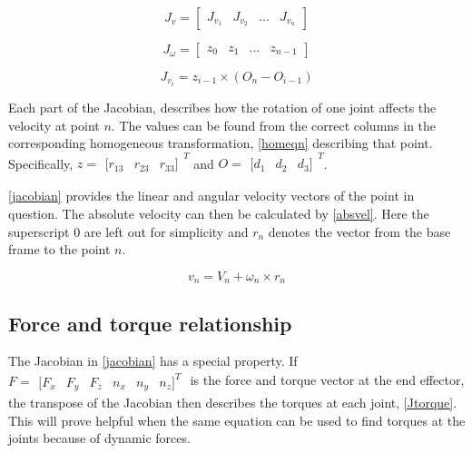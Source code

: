\begin{equation}\label{Jvel}
J_v = \begin{bmatrix}
J_{v_1} & J_{v_2} & ... & J_{v_n}
\end{bmatrix}
\end{equation}

\begin{equation}\label{Jomega}
J_{\omega} = \begin{bmatrix}
z_0 & z_1 & ... & z_{n-1}
\end{bmatrix}
\end{equation}

\begin{equation}\label{Jvi}
J_{v_i} = z_{i-1}\times (O_n - O_{i-1})
\end{equation}

Each part of the Jacobian,  describes how the rotation of one joint affects the velocity at point $n$. The values can be found from the correct columns in the corresponding homogeneous transformation, \eqref{homeqn} describing that point. Specifically, $z=\begin{matrix}[
r_{13} & r_{23} & r_{33}]
\end{matrix}^T$ and $O=\begin{matrix}[
d_{1} & d_{2} & d_{3}]
\end{matrix}^T$.

\eqref{jacobian} provides the linear and angular velocity vectors of the point in question. The absolute velocity can then be calculated by \eqref{absvel}. Here the superscript $0$ are left out for simplicity and $r_n$ denotes the vector from the base frame to the point $n$.

\begin{equation}\label{absvel}
v_{n}=V_n+\omega_n\times r_n
\end{equation}

\subsection{Force and torque relationship}

The Jacobian in \eqref{jacobian} has a special property. If \\$F = \begin{matrix}[
F_{x} & F_{y} & F_{z} & n_x & n_y & n_z]^T
\end{matrix}$ is the force and torque vector at the end effector, the transpose of the Jacobian then describes the torques at each joint, \eqref{Jtorque}. This will prove helpful when the same equation can be used to find torques at the joints because of dynamic forces.

